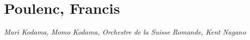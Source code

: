 \chapter{Poulenc, Francis}
\label{cha:poulenc}

  \textit{Mari Kodama, Momo Kodama, Orchestre de la Suisse Romande, Kent Nagano}